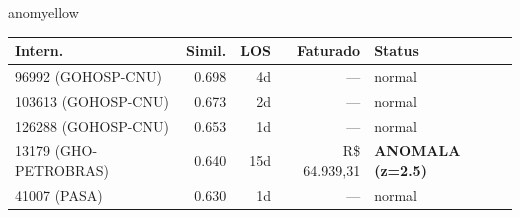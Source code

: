 \documentclass[a4paper,10pt]{article}
\begin{document}
\begin{anomalycard}[Internacao 11490 | GHO-PETROBRAS | MODERADO (z=2.24)]{anomyellow}
\begin{tabular}{l r r r l}\toprule\textbf{Intern.} & \textbf{Simil.} & \textbf{LOS} & \textbf{Faturado} & \textbf{Status} \\\midrule
96992 (GOHOSP-CNU) & 0.698 & 4d & --- & \textcolor{jcubeblue}{normal} \\
103613 (GOHOSP-CNU) & 0.673 & 2d & --- & \textcolor{jcubeblue}{normal} \\
126288 (GOHOSP-CNU) & 0.653 & 1d & --- & \textcolor{jcubeblue}{normal} \\
13179 (GHO-PETROBRAS) & 0.640 & 15d & R\$ 64.939,31 & \textcolor{anomred}{\textbf{ANOMALA (z=2.5)}} \\
41007 (PASA) & 0.630 & 1d & --- & \textcolor{jcubeblue}{normal} \\
\bottomrule\end{tabular}


\end{anomalycard}

\newpage
\end{document}
